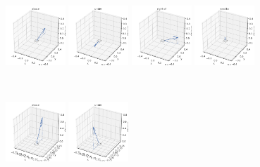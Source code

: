 \begin{figure}
	\centering
	\begin{minipage}{\textwidth}
		\centering
		\includegraphics[width=0.2\textwidth]{studies/sc2020/figures/above_vg_features.pdf}
		\includegraphics[width=0.2\textwidth]{studies/sc2020/figures/under_vg_features.pdf}
		\includegraphics[width=0.2\textwidth]{studies/sc2020/figures/right_of_vg_features.pdf}
		\includegraphics[width=0.2\textwidth]{studies/sc2020/figures/next_to_vg_features.pdf}
	\end{minipage}\\
	\begin{minipage}{\textwidth}
		\centering
		\includegraphics[width=0.2\textwidth]{studies/sc2020/figures/above_st_features.pdf}
		\includegraphics[width=0.2\textwidth]{studies/sc2020/figures/under_st_features.pdf}

\end{minipage}
\end{figure}
